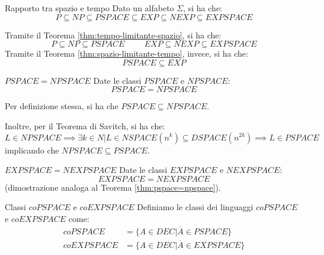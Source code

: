 \begin{Thm}{Rapporto tra spazio e tempo}{}
Dato un alfabeto $\Sigma$, si ha che:
\begin{equation*}
    P\subseteq NP\subseteq PSPACE\subseteq EXP\subseteq NEXP\subseteq EXPSPACE    
\end{equation*}
\begin{demonstration}
Tramite il Teorema \ref{thm:tempo-limitante-spazio}, si ha che: 
\begin{equation*}
    P\subseteq NP\subseteq PSPACE\hspace{1cm} EXP\subseteq NEXP\subseteq EXPSPACE    
\end{equation*}
Tramite il Teorema \ref{thm:spazio-limitante-tempo}, invece, si ha che:
\begin{equation*}
    PSPACE\subseteq EXP
\end{equation*}
\end{demonstration}
\end{Thm}

\begin{Thm}{$PSPACE = NPSPACE$}{}\label{thm:pspace=npspace}
Date le classi $PSPACE$ e $NPSPACE$:
\begin{equation*}
    PSPACE = NPSPACE    
\end{equation*}
\begin{demonstration}
Per definizione stessa, si ha che $PSPACE\subseteq NPSPACE$.

Inoltre, per il Teorema di Savitch, si ha che: 
\begin{equation*}
    L\in NPSPACE\implies \exists k\in N | L\in NSPACE(n^k)\subseteq DSPACE(n^{2k})\implies L\in PSPACE     
\end{equation*}
implicando che $NPSPACE\subseteq PSPACE$.
\end{demonstration}    
\end{Thm}

\begin{Thm}{$EXPSPACE = NEXPSPACE$}{}
Date le classi $EXPSPACE$ e $NEXPSPACE$:
\begin{equation*}
    EXPSPACE = NEXPSPACE    
\end{equation*}
(dimostrazione analoga al Teorema \ref{thm:pspace=npspace}).    
\end{Thm}

\begin{Definition}{Classi $coPSPACE$ e $coEXPSPACE$}{}
Definiamo le classi dei linguaggi $coPSPACE$ e $coEXPSPACE$ come:
\begin{align*}
    coPSPACE &= \{A\in DEC | \overline{A}\in PSPACE\}\\
    coEXPSPACE &= \{A\in DEC | \overline{A}\in EXPSPACE\}    
\end{align*}
\end{Definition}

